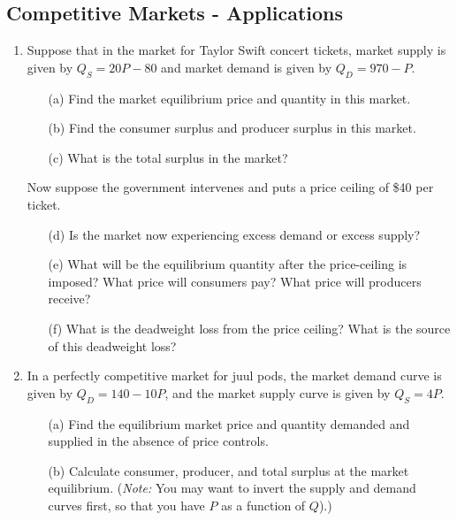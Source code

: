\documentclass[11pt]{article}
\begin{document}
\subsection*{Competitive Markets - Applications}

\begin{enumerate}
  \item Suppose that in the market for Taylor Swift concert tickets, market supply is given by $Q_S = 20P - 80$ and market demand is given by $Q_D = 970 - P$.

  \begin{enumerate}
    \item[(a)] Find the market equilibrium price and quantity in this market.

    \item[(b)] Find the consumer surplus and producer surplus in this market.

    \item[(c)] What is the total surplus in the market?
  \end{enumerate}

  Now suppose the government intervenes and puts a price ceiling of \$40 per ticket.

  \begin{enumerate}
    \item[(d)] Is the market now experiencing excess demand or excess supply?

    \item[(e)] What will be the equilibrium quantity after the price-ceiling is imposed? What price will consumers pay? What price will producers receive?

    \item[(f)] What is the deadweight loss from the price ceiling? What is the source of this deadweight loss?
  \end{enumerate}


  \item In a perfectly competitive market for juul pods, the market demand curve is given by $Q_D = 140 - 10P$, and the market supply curve is given by $Q_S = 4P$.
  
  \begin{enumerate}
    \item[(a)] Find the equilibrium market price and quantity demanded and supplied in the absence of price controls.
    
    \item[(b)] Calculate consumer, producer, and total surplus at the market equilibrium. (\emph{Note:} You may want to invert the supply and demand curves first, so that you have $P$ as a function of $Q$).)
    

\end{enumerate}
\end{enumerate}
\end{document}
